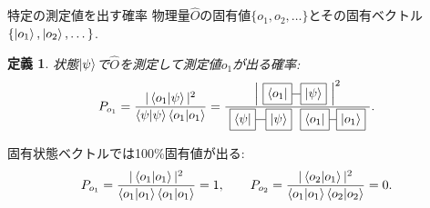 \documentclass[dvipdfm]{beamer}
\newtheorem*{defn}{定義}
\begin{document}
\begin{frame}{特定の測定値を出す確率}
    物理量$\hat{O}$の固有値$\{o_1,o_2,\dots\}$とその固有ベクトル$\{\ket{o_1}, \ket{o_2}, \dots\}$.
    \begin{defn}
        状態$\ket{\psi}$で$\hat{O}$を測定して測定値$o_1$が出る確率:
        \begin{equation*}
            P_{o_1}=\frac{|\braket{o_1}{\psi}|^2}{\braket{\psi}\braket{o_1}}
            =
            \frac{
                \qty|
                    \vcenter{\hbox{
                        \begin{tikzpicture}
                            \node at(0,0)[draw,rectangle](o){$\bra{o_1}$};
                            \node at(1,0)[draw,rectangle](psi){$\ket{\psi}$};
                            \draw(o.east)--(psi.west);
                        \end{tikzpicture}
                    }}
                |^2
            }{
                \vcenter{\hbox{
                    \begin{tikzpicture}
                        \node at(0,0)[draw,rectangle](o){$\bra{\psi}$};
                        \node at(1,0)[draw,rectangle](psi){$\ket{\psi}$};
                        \draw(o.east)--(psi.west);
                    \end{tikzpicture}
                }}
                \vcenter{\hbox{
                    \begin{tikzpicture}
                        \node at(0,0)[draw,rectangle](o){$\bra{o_1}$};
                        \node at(1,0)[draw,rectangle](psi){$\ket{o_1}$};
                        \draw(o.east)--(psi.west);
                    \end{tikzpicture}
                }}
            }.
        \end{equation*}
    \end{defn}
    固有状態ベクトルでは100\%固有値が出る:
    \begin{equation*}
        P_{o_1}=\frac{|\braket{o_1}|^2}{\braket{o_1}\braket{o_1}}=1,
        \qquad
        P_{o_2}=\frac{|\braket{o_2}{o_1}|^2}{\braket{o_1}\braket{o_2}}=0.
    \end{equation*}
\end{frame}
\end{document}
